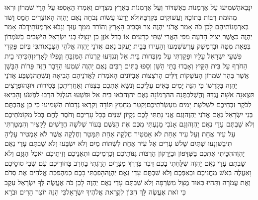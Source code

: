 \documentclass[../main/main.tex]{subfiles}
\begin{document}
\begin{multicols}{\ncols}
יִנָּבֵא\PreVerseSpace{}הַשְׁמִיעוּ עַל אַרְמְנוֹת בְּאַשְׁדּוֹד וְעַל אַרְמְנוֹת בְּאֶרֶץ מִצְרָיִם וְאִמְרוּ הֵאָסְפוּ עַל הָרֵי שֹׁמְרוֹן וּרְאוּ מְהוּמֹת רַבּוֹת בְּתוֹכָהּ וַעֲשׁוּקִים בְּקִרְבָּהּ\PreVerseSpace{}וְלֹא יָדְעוּ עֲשׂוֹת נְכֹחָה נְאֻם יַהְוֶה הָאוֹצְרִים חָמָס וָשֹׁד בְּאַרְמְנוֹתֵיהֶם לָכֵן כֹּה אָמַר אֲדֹנַי יַהְוֶה צַר וּסְבִיב הָאָרֶץ וְהוֹרִד מִמֵּךְ עֻזֵּךְ וְנָבֹזּוּ אַרְמְנוֹתָיִךְ\PreVerseSpace{}כֹּה אָמַר יַהְוֶה כַּאֲשֶׁר יַצִּיל הָרֹעֶה מִפִּי הָאֲרִי שְׁתֵּי כְרָעַיִם אוֹ בְדַל אֹזֶן כֵּן יִנָּצְלוּ בְּנֵי יִשְׂרָאֵל הַיֹּשְׁבִים בְּשֹׁמְרוֹן בִּפְאַת מִטָּה וּבִדְמֶשֶׁק עָרֶשׂ\PreVerseSpace{}שִׁמְעוּ וְהָעִידוּ בְּבֵית יַעֲקֹב נְאֻם אֲדֹנַי יַהְוֶה אֱלֹהֵי הַצְּבָאוֹת\PreVerseSpace{}כִּי בְּיוֹם פָּקְדִי פִשְׁעֵי יִשְׂרָאֵל עָלָיו וּפָקַדְתִּי עַל מִזְבְּחוֹת בֵּית אֵל וְנִגְדְּעוּ קַרְנוֹת הַמִּזְבֵּחַ וְנָפְלוּ לָאָרֶץ\PreVerseSpace{}וְהִכֵּיתִי בֵית הַחֹרֶף עַל בֵּית הַקָּיִץ וְאָבְדוּ בָּתֵּי הַשֵּׁן וְסָפוּ בָּתִּים רַבִּים נְאֻם יַהְוֶה \ClosedSection{}שִׁמְעוּ הַדָּבָר הַזֶּה פָּרוֹת הַבָּשָׁן אֲשֶׁר בְּהַר שֹׁמְרוֹן הָעֹשְׁקוֹת דַּלִּים הָרֹצְצוֹת אֶבְיוֹנִים הָאֹמְרֹת לַאֲדֹנֵיהֶם הָבִיאָה וְנִשְׁתֶּה\PreVerseSpace{}נִשְׁבַּע אֲדֹנַי יַהְוֶה בְּקָדְשׁוֹ כִּי הִנֵּה יָמִים בָּאִים עֲלֵיכֶם וְנִשָּׂא אֶתְכֶם בְּצִנּוֹת וְאַחֲרִיתְכֶן בְּסִירוֹת דּוּגָה\PreVerseSpace{}וּפְרָצִים תֵּצֶאנָה אִשָּׁה נֶגְדָּהּ וְהֻשְׁלַכְתֶּנָה\SubEnd{} הַהַרְמוֹנָה נְאֻם יַהְוֶה\PreVerseSpace{}בֹּאוּ בֵית אֵל וּפִשְׁעוּ הַגִּלְגָּל הַרְבּוּ לִפְשֹׁעַ וְהָבִיאוּ לַבֹּקֶר זִבְחֵיכֶם לִשְׁלֹשֶׁת יָמִים מַעְשְׂרֹתֵיכֶם\PreVerseSpace{}וְקַטֵּר מֵחָמֵץ תּוֹדָה וְקִרְאוּ נְדָבוֹת הַשְׁמִיעוּ כִּי כֵן אֲהַבְתֶּם בְּנֵי יִשְׂרָאֵל נְאֻם אֲדֹנַי יַהְוֶה\PreVerseSpace{}וְגַם אֲנִי נָתַתִּי לָכֶם נִקְיוֹן שִׁנַּיִם בְּכָל עָרֵיכֶם וְחֹסֶר לֶחֶם בְּכֹל מְקוֹמֹתֵיכֶם וְלֹא שַׁבְתֶּם עָדַי נְאֻם יַהְוֶה\PreVerseSpace{}וְגַם אָנֹכִי מָנַעְתִּי מִכֶּם אֶת הַגֶּשֶׁם בְּעוֹד שְׁלֹשָׁה חֳדָשִׁים לַקָּצִיר וְהִמְטַרְתִּי עַל עִיר אֶחָת וְעַל עִיר אַחַת לֹא אַמְטִיר חֶלְקָה אַחַת תִּמָּטֵר וְחֶלְקָה אֲשֶׁר לֹא אַמְטִיר\SubEnd{} עָלֶיהָ תִּיבָשׁ\PreVerseSpace{}וְנָעוּ שְׁתַּיִם שָׁלֹשׁ עָרִים אֶל עִיר אַחַת לִשְׁתּוֹת מַיִם וְלֹא יִשְׂבָּעוּ וְלֹא שַׁבְתֶּם עָדַי נְאֻם יַהְוֶה\PreVerseSpace{}הִכֵּיתִי אֶתְכֶם בַּשִּׁדָּפוֹן וּבַיֵּרָקוֹן הַרְבּוֹת גַּנּוֹתֵיכֶם וְכַרְמֵיכֶם וּתְאֵנֵיכֶם וְזֵיתֵיכֶם יֹאכַל הַגָּזָם וְלֹא שַׁבְתֶּם עָדַי נְאֻם יַהְוֶה \ClosedSection{}שִׁלַּחְתִּי בָכֶם דֶּבֶר בְּדֶרֶךְ מִצְרַיִם הָרַגְתִּי בַחֶרֶב בַּחוּרֵיכֶם עִם שְׁבִי סוּסֵיכֶם וָאַעֲלֶה בְּאֹשׁ מַחֲנֵיכֶם וּבְאַפְּכֶם וְלֹא שַׁבְתֶּם עָדַי נְאֻם יַהְוֶה\PreVerseSpace{}הָפַכְתִּי בָכֶם כְּמַהְפֵּכַת אֱלֹהִים אֶת סְדֹם וְאֶת עֲמֹרָה וַתִּהְיוּ כְּאוּד מֻצָּל מִשְּׂרֵפָה וְלֹא שַׁבְתֶּם עָדַי נְאֻם יַהְוֶה \ClosedSection{}לָכֵן כֹּה אֶעֱשֶׂה לְּךָ יִשְׂרָאֵל עֵקֶב כִּי זֹאת אֶעֱשֶׂה לָּךְ הִכּוֹן לִקְרַאת אֱלֹהֶיךָ יִשְׂרָאֵל\PreVerseSpace{}כִּי הִנֵּה יוֹצֵר הָרִים וּבֹרֵא 
\end{multicols}
\end{document}

